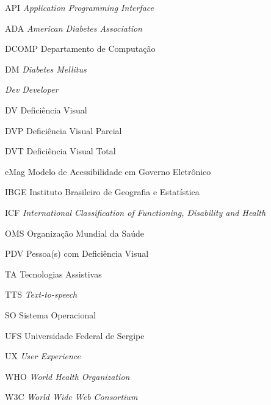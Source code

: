 
\begin{siglas}
  	\item[API]{\textit{Application Programming Interface}}
  	\item[ADA]{\textit{American Diabetes Association}}
  	\item[DCOMP]{Departamento de Computação}
  	\item[DM]{\textit{Diabetes Mellitus}}
  	\item[\emph{Dev}]{\textit{Developer}}
  	\item[DV]{Deficiência Visual}
  	\item[DVP]{Deficiência Visual Parcial}
  	\item[DVT]{Deficiência Visual Total}
  	\item[eMag]{Modelo de Acessibilidade em Governo Eletrônico}
  	\item[IBGE]{Instituto Brasileiro de Geografia e Estatística}
  	\item[ICF]{\textit{International Classification of Functioning, Disability and Health}}
  	\item[OMS]{Organização Mundial da Saúde}
  	\item[PDV]{Pessoa(s) com Deficiência Visual}
  	\item[TA]{Tecnologias Assistivas}
  	\item[TTS]{\textit{Text-to-speech}}
  	\item[SO]{Sistema Operacional}
	\item[UFS]{Universidade Federal de Sergipe}
  	\item[UX]{\textit{User Experience}}
  	\item[WHO]{\textit{World Health Organization}}
  	\item[W3C]{\textit{World Wide Web Consortium}}
\end{siglas}